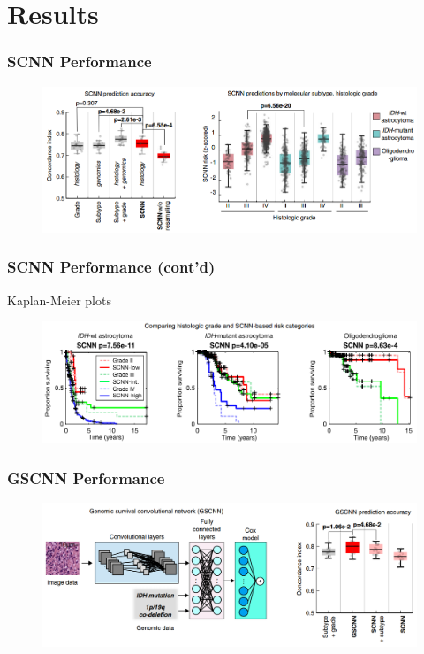 \documentclass[usenames,dvipsnames]{beamer}
\begin{document}
\section{Results}\label{sec:results}
\begin{frame}
  \frametitle{SCNN Performance}
  \begin{figure}[ht]
    \centering
    \includegraphics[width=1.0\textwidth]{figures/scnn_performance.png}
    \caption*{\label{fig:scnn-performance}}
  \end{figure}
\end{frame}
\begin{frame}
  \frametitle{SCNN Performance (cont'd)}
  Kaplan-Meier plots
  \begin{figure}[ht]
    \centering
    \includegraphics[width=1.0\textwidth]{figures/kaplan_meier.png}
    \caption*{\label{fig:kaplan-meier}}
  \end{figure}
\end{frame}
\begin{frame}
  \frametitle{GSCNN Performance}
  \begin{figure}[ht]
    \centering
    \includegraphics[width=1.0\textwidth]{figures/gscnn.png}
    \caption*{\label{fig:gscnn} }
  \end{figure}
\end{frame}
\end{document}
